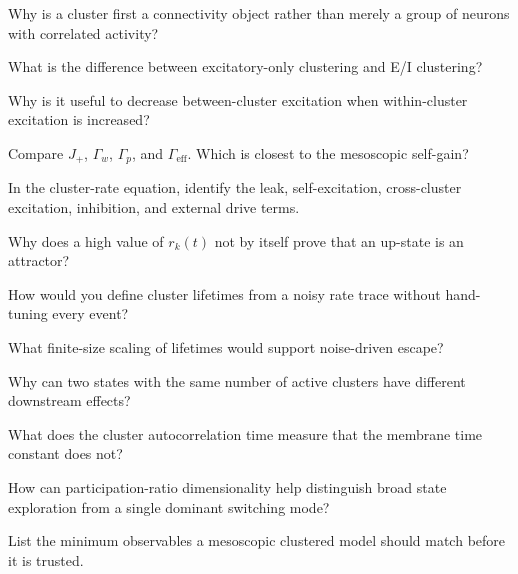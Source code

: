\begin{conceptquestions}
  \item Why is a cluster first a connectivity object rather than merely a group of neurons with correlated activity?
  \item What is the difference between excitatory-only clustering and E/I clustering?
  \item Why is it useful to decrease between-cluster excitation when within-cluster excitation is increased?
  \item Compare $J_+$, $\Gamma_w$, $\Gamma_p$, and $\Gamma_{\mathrm{eff}}$. Which is closest to the mesoscopic self-gain?
  \item In the cluster-rate equation, identify the leak, self-excitation, cross-cluster excitation, inhibition, and external drive terms.
  \item Why does a high value of $r_k(t)$ not by itself prove that an up-state is an attractor?
  \item How would you define cluster lifetimes from a noisy rate trace without hand-tuning every event?
  \item What finite-size scaling of lifetimes would support noise-driven escape?
  \item Why can two states with the same number of active clusters have different downstream effects?
  \item What does the cluster autocorrelation time measure that the membrane time constant does not?
  \item How can participation-ratio dimensionality help distinguish broad state exploration from a single dominant switching mode?
  \item List the minimum observables a mesoscopic clustered model should match before it is trusted.
\end{conceptquestions}

\clearpage
